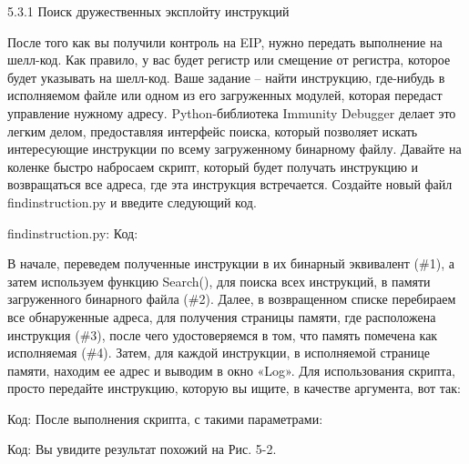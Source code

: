 \documentclass[12pt]{book}
\begin{document}
5.3.1 Поиск дружественных эксплойту инструкций

После того как вы получили контроль на EIP, нужно передать выполнение на шелл-код. Как правило, у вас будет регистр или смещение от регистра, которое будет указывать на шелл-код. Ваше задание – найти инструкцию, где-нибудь в исполняемом файле или одном из его загруженных модулей, которая передаст управление нужному адресу. Python-библиотека Immunity Debugger делает это легким делом, предоставляя интерфейс поиска, который позволяет искать интересующие инструкции по всему загруженному бинарному файлу. Давайте на коленке быстро набросаем скрипт, который будет получать инструкцию и возвращаться все адреса, где эта инструкция встречается. Создайте новый файл findinstruction.py и введите следующий код.

findinstruction.py:
Код:






В начале, переведем полученные инструкции в их бинарный эквивалент (\#1), а затем используем функцию Search(), для поиска всех инструкций, в памяти загруженного бинарного файла (\#2). Далее, в возвращенном списке перебираем все обнаруженные адреса, для получения страницы памяти, где расположена инструкция (\#3), после чего удостоверяемся в том, что память помечена как исполняемая (\#4). Затем, для каждой инструкции, в исполняемой странице памяти, находим ее адрес и выводим в окно «Log». Для использования скрипта, просто передайте инструкцию, которую вы ищите, в качестве аргумента, вот так: 

Код:
После выполнения скрипта, с такими параметрами:

Код:
Вы увидите результат похожий на Рис. 5-2.
\end{document}
